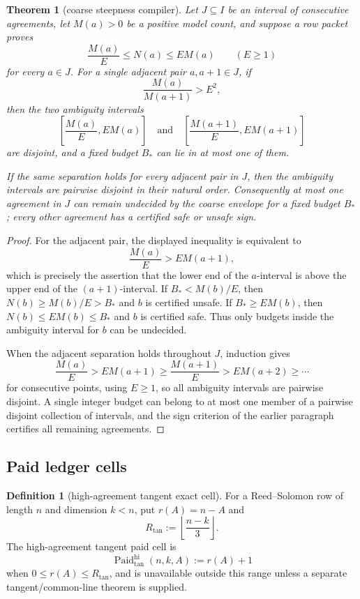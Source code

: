 \documentclass[11pt]{article}
\newtheorem{theorem}{Theorem}[section]
\theoremstyle{definition}
\newtheorem{definition}[definition]{Definition}
\theoremstyle{remark}
\providecommand{\Paid}{\operatorname{Paid}}
\providecommand{\floor}[1]{\left\lfloor #1\right\rfloor}
\begin{document}
\begin{theorem}[coarse steepness compiler]\label{thm:capf-steepness}
Let $J\subseteq I$ be an interval of consecutive agreements, let $M(a)>0$ be a positive model count, and suppose a row packet proves
\[
        \frac{M(a)}{E}\le N(a)\le E M(a)\qquad(E\ge1)
\]
for every $a\in J$.  For a single adjacent pair $a,a+1\in J$, if
\[
        \frac{M(a)}{M(a+1)}>E^2,
\]
then the two ambiguity intervals
\[
        \left[\frac{M(a)}E,EM(a)\right]
        \quad\text{and}\quad
        \left[\frac{M(a+1)}E,EM(a+1)\right]
\]
are disjoint, and a fixed budget $B_*$ can lie in at most one of them.

If the same separation holds for every adjacent pair in $J$, then the ambiguity intervals are pairwise disjoint in their natural order.  Consequently at most one agreement in $J$ can remain undecided by the coarse envelope for a fixed budget $B_*$; every other agreement has a certified safe or unsafe sign.
\end{theorem}

\begin{proof}
For the adjacent pair, the displayed inequality is equivalent to
\[
        \frac{M(a)}E>EM(a+1),
\]
which is precisely the assertion that the lower end of the $a$-interval is above the upper end of the $(a+1)$-interval.  If $B_*<M(b)/E$, then $N(b)\ge M(b)/E>B_*$ and $b$ is certified unsafe.  If $B_*\ge EM(b)$, then $N(b)\le EM(b)\le B_*$ and $b$ is certified safe.  Thus only budgets inside the ambiguity interval for $b$ can be undecided.

When the adjacent separation holds throughout $J$, induction gives
\[
        \frac{M(a)}E>EM(a+1)\ge \frac{M(a+1)}E>EM(a+2)\ge\cdots
\]
for consecutive points, using $E\ge1$, so all ambiguity intervals are pairwise disjoint.  A single integer budget can belong to at most one member of a pairwise disjoint collection of intervals, and the sign criterion of the earlier paragraph certifies all remaining agreements.
\end{proof}

\subsection{Paid ledger cells}

\begin{definition}[high-agreement tangent exact cell]\label{def:capf-tangent-cell}
For a Reed--Solomon row of length $n$ and dimension $k<n$, put $r(A)=n-A$ and
\[
        R_{\tan}:=\floor{\frac{n-k}{3}}.
\]
The high-agreement tangent paid cell is
\[
        \Paid_{\tan}^{\mathrm{hi}}(n,k,A):=r(A)+1
\]
when $0\le r(A)\le R_{\tan}$, and is unavailable outside this range unless a separate tangent/common-line theorem is supplied.
\end{definition}
\end{document}

